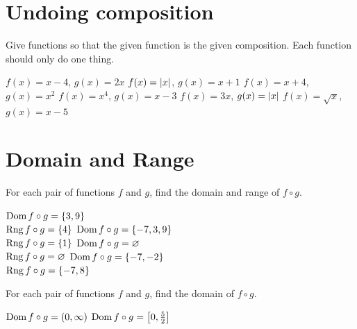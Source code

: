 \section*{Undoing composition}
Give functions so that the given function is the given composition. Each function should only do one thing.
\begin{smenum}
\mitemxxx
{$f(x)=x-4$, $g(x)=2x$}
{$f(x)=\left|x\right|$, $g(x)=x+1$}
{$f(x)=x+4$, $g(x)=x^2$}
\mitemxxx
{$f(x)=x^4$, $g(x)=x-3$}
{$f(x)=3x$, $g(x)=\left|x\right|$}
{$f(x)=\sqrt{x}$, $g(x)=x-5$}
\end{smenum}

\section*{Domain and Range}
For each pair of functions $f$ and $g$, find the domain and range of $f\circ g$.
\begin{smenum}
\mitemxx
{$\operatorname{Dom} f\circ g=\left\{3,9\right\}$\\$\operatorname{Rng} f\circ g=\left\{4\right\}$}
{$\operatorname{Dom} f\circ g=\left\{-7,3,9\right\}$\\$\operatorname{Rng} f\circ g=\left\{1\right\}$}
\mitemxx
{$\operatorname{Dom} f\circ g=\varnothing$\\$\operatorname{Rng} f\circ g=\varnothing$}
{$\operatorname{Dom} f\circ g=\left\{-7,-2\right\}$\\$\operatorname{Rng} f\circ g=\left\{-7,8\right\}$}
\end{smenum}
For each pair of functions $f$ and $g$, find the domain of $f\circ g$.
\begin{smenum}
\mitemxx
{$\operatorname{Dom} f\circ g=(0,\infty)$}
{$\operatorname{Dom} f\circ g=\left[0,\frac{5}{2}\right]$}
\end{smenum}
